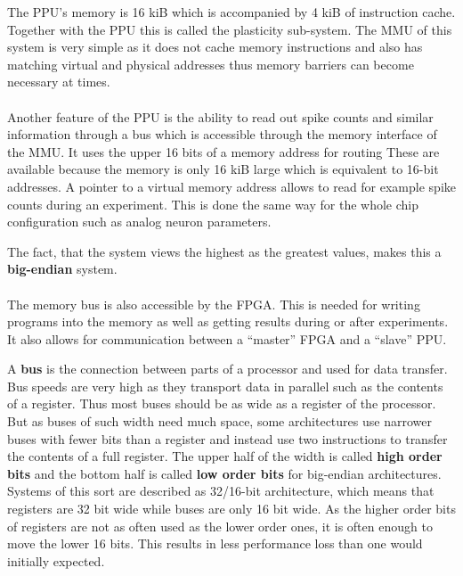 {The \ac{PPU}'s memory is 16 kiB which is accompanied by 4 kiB of instruction cache.
Together with the \ac{PPU} this is called the plasticity sub-system.
The \ac{MMU} of this system is very simple as it does not cache memory instructions and also has matching virtual and physical addresses thus memory barriers can become necessary at times.
\\
\\
Another feature of the \ac{PPU} is the ability to read out spike counts and similar information through a bus which is accessible through the memory interface of the \ac{MMU}.
It uses the upper 16 bits of a memory address for routing
These are available because the memory is only 16 kiB large which is equivalent to 16-bit addresses.
A pointer to a virtual memory address allows to read for example spike counts during an experiment.
This is done the same way for the whole chip configuration such as analog neuron parameters.

The fact, that the system views the highest as the greatest values, makes this a \textbf{big-endian} system.
\\
\\
The memory bus is also accessible by the \ac{FPGA}.
This is needed for writing programs into the memory as well as getting results during or after experiments.
It also allows for communication between a ``master'' \ac{FPGA} and a ``slave'' \ac{PPU}.

A \textbf{bus} is the connection between parts of a processor and used for data transfer.
Bus speeds are very high as they transport data in parallel such as the contents of a register.
Thus most buses should be as wide as a register of the processor.
But as buses of such width need much space, some architectures use narrower buses with fewer bits than a register and instead use two instructions to transfer the contents of a full register.
The upper half of the width is called \textbf{high order bits} and the bottom half is called \textbf{low order bits} for big-endian architectures.
Systems of this sort are described as 32/16-bit architecture, which means that registers are 32 bit wide while buses are only 16 bit wide.
As the higher order bits of registers are not as often used as the lower order ones, it is often enough to move the lower 16 bits.
This results in less performance loss than one would initially expected.

}
